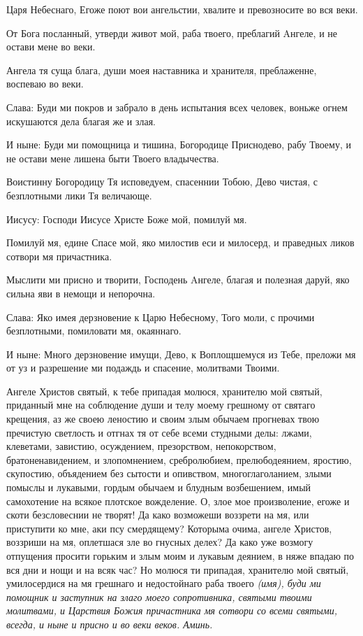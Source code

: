 Царя Небеснаго, Егоже поют вои ангельстии, хвалите и превозносите во вся веки.


  От Бога посланный, утверди живот мой, раба твоего, преблагий Aнгеле, и не остави мене во веки.


  Ангела тя суща блага, души моея наставника и хранителя, преблаженне, воспеваю во веки.


  Слава: Буди ми покров и забрало в день испытания всех человек, воньже огнем искушаются дела благая же и злая.


  И ныне: Буди ми помощница и тишина, Богородице Приснодево, рабу Твоему, и не остави мене лишена быти Твоего владычества.



Воистинну Богородицу Тя исповедуем, спасеннии Тобою, Дево чистая, с безплотными лики Тя величающе.


  Иисусу: Господи Иисусе Христе Боже мой, помилуй мя.


  Помилуй мя, едине Спасе мой, яко милостив еси и милосерд, и праведных ликов сотвори мя причастника.


  Мыслити ми присно и творити, Господень Aнгеле, благая и полезная даруй, яко сильна яви в немощи и непорочна.


  Слава: Яко имея дерзновение к Царю Небесному, Того моли, с прочими безплотными, помиловати мя, окаяннаго.


  И ныне: Много дерзновение имущи, Дево, к Воплощшемуся из Тебе, преложи мя от уз и разрешение ми подаждь и спасение, молитвами Твоими.





Ангеле Христов святый, к тебе припадая молюся, хранителю мой святый, приданный мне на соблюдение души и телу моему грешному от святаго крещения, аз же своею леностию и своим злым обычаем прогневах твою пречистую светлость и отгнах тя от себе всеми студными делы: лжами, клеветами, завистию, осуждением, презорством, непокорством, братоненавидением, и злопомнением, сребролюбием, прелюбодеянием, яростию, скупостию, объядением без сытости и опивством, многоглаголанием, злыми помыслы и лукавыми, гордым обычаем и блудным возбешением, имый самохотение на всякое плотское вожделение. О, злое мое произволение, егоже и скоти безсловеснии не творят! Да како возможеши воззрети на мя, или приступити ко мне, аки псу смердящему? Которыма очима, ангеле Христов, воззриши на мя, оплетшася зле во гнусных делех? Да како уже возмогу отпущения просити горьким и злым моим и лукавым деянием, в няже впадаю по вся дни и нощи и на всяк час? Но молюся ти припадая, хранителю мой святый, умилосердися на мя грешнаго и недостойнаго раба твоего \itshape (имя)\normalfont{}, буди ми помощник и заступник на злаго моего сопротивника, святыми твоими молитвами, и Царствия Божия причастника мя сотвори со всеми святыми, всегда, и ныне и присно и во веки веков. Аминь.\mychapterending

